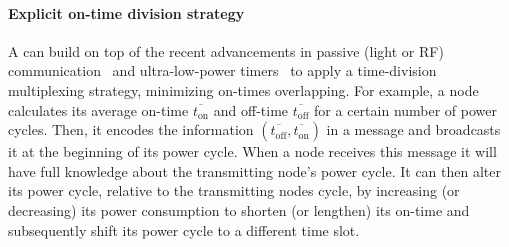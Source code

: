 \paragraph{Explicit on-time division strategy}
A \cis can build on top of the recent advancements in passive (light or RF) communication~\cite{LuzLink,liu2013ambient} and ultra-low-power timers~\cite{hester2017timely} to apply a time-division multiplexing strategy, minimizing on-times overlapping. For example, a node calculates its average on-time $\overline{t_\text{on}}$ and off-time $\overline{t_\text{off}}$ for a certain number of power cycles. Then, it encodes the information $({\overline{t_\text{off}}, \overline{t_\text{on}}})$ in a message and broadcasts it at the beginning of its power cycle. When a node receives this message it will have full knowledge about the transmitting node's power cycle. It can then alter its power cycle, relative to the transmitting nodes cycle, by increasing (or decreasing) its power consumption to shorten (or lengthen) its on-time and subsequently shift its power cycle to a different time slot. 

